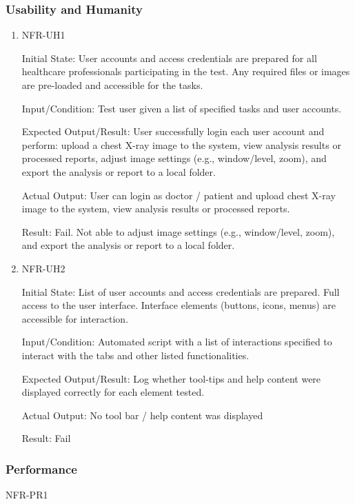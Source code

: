 \documentclass[12pt, titlepage]{article}
\begin{document}
\subsubsection{Usability and Humanity}

\begin{enumerate}

  \item{NFR-UH1\\}\label{NFR-UH1}
  
  Initial State: User accounts and access credentials are prepared for all healthcare professionals participating in the test. Any required files or images are pre-loaded and accessible for the tasks.
  
  Input/Condition: Test user given a list of specified tasks and user accounts.
  
  Expected Output/Result: User successfully login each user account and perform: upload a chest X-ray image to the system, view analysis results or processed reports, adjust image settings (e.g., window/level, zoom), and export the analysis or report to a local folder.
  
  Actual Output: User can login as doctor / patient and upload chest X-ray image to the system, view analysis results or processed reports.

  Result: Fail. Not able to adjust image settings (e.g., window/level, zoom), and export the analysis or report to a local folder.

\item{NFR-UH2\\}\label{NFR-UH2}

Initial State: List of user accounts and access credentials are prepared. Full access to the user interface. Interface elements (buttons, icons, menus) are accessible for interaction.

Input/Condition: Automated script with a list of interactions specified to interact with the tabs and other listed functionalities.

Expected Output/Result: Log whether tool-tips and help content were displayed correctly for each element tested.

Actual Output: No tool bar / help content was displayed 

Result: Fail

\end{enumerate}

\subsubsection{Performance}
\item{NFR-PR1\\}\label{NFR-PR1}
\end{document}
